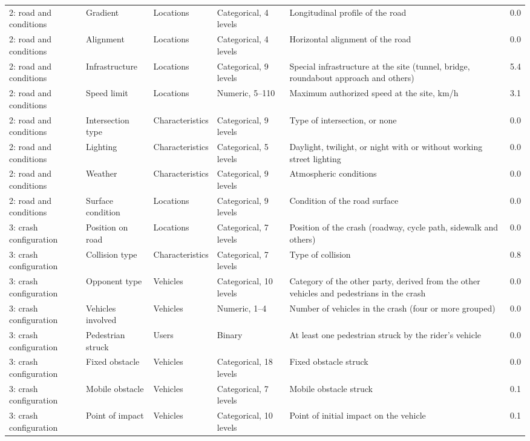 \begin{table}[tp]
\begin{threeparttable}
{\begin{tabular}{p{2.6cm}p{2.5cm}p{2.0cm}p{2.6cm}p{5.6cm}r}
2: road and conditions & Gradient & Locations & Categorical, 4 levels & Longitudinal profile of the road & 0.0 \\
2: road and conditions & Alignment & Locations & Categorical, 4 levels & Horizontal alignment of the road & 0.0 \\
2: road and conditions & Infrastructure & Locations & Categorical, 9 levels & Special infrastructure at the site (tunnel, bridge, roundabout approach and others) & 5.4 \\
2: road and conditions & Speed limit & Locations & Numeric, 5–110 & Maximum authorized speed at the site, km/h & 3.1 \\
2: road and conditions & Intersection type & Characteristics & Categorical, 9 levels & Type of intersection, or none & 0.0 \\
2: road and conditions & Lighting & Characteristics & Categorical, 5 levels & Daylight, twilight, or night with or without working street lighting & 0.0 \\
2: road and conditions & Weather & Characteristics & Categorical, 9 levels & Atmospheric conditions & 0.0 \\
2: road and conditions & Surface condition & Locations & Categorical, 9 levels & Condition of the road surface & 0.0 \\
3: crash configuration & Position on road & Locations & Categorical, 7 levels & Position of the crash (roadway, cycle path, sidewalk and others) & 0.0 \\
3: crash configuration & Collision type & Characteristics & Categorical, 7 levels & Type of collision & 0.8 \\
3: crash configuration & Opponent type & Vehicles & Categorical, 10 levels & Category of the other party, derived from the other vehicles and pedestrians in the crash & 0.0 \\
3: crash configuration & Vehicles involved & Vehicles & Numeric, 1–4 & Number of vehicles in the crash (four or more grouped) & 0.0 \\
3: crash configuration & Pedestrian struck & Users & Binary & At least one pedestrian struck by the rider's vehicle & 0.0 \\
3: crash configuration & Fixed obstacle & Vehicles & Categorical, 18 levels & Fixed obstacle struck & 0.0 \\
3: crash configuration & Mobile obstacle & Vehicles & Categorical, 7 levels & Mobile obstacle struck & 0.1 \\
3: crash configuration & Point of impact & Vehicles & Categorical, 10 levels & Point of initial impact on the vehicle & 0.1 \\

\end{tabular}}
\end{threeparttable}
\end{table}
